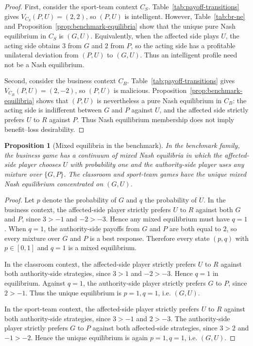 \documentclass[a4paper,fleqn]{cas-dc}
\newtheorem{proposition}[definition]{Proposition}
\theoremstyle{remark}
\begin{document}
\begin{proof}
First, consider the sport-team context $C_S$. Table~\ref{tab:payoff-transitions} gives $V_{C_S}(P,U)=(2,2)$, so $(P,U)$ is intelligent. However, Table~\ref{tab:br-ne} and Proposition~\ref{prop:benchmark-equilibria} show that the unique pure Nash equilibrium in $C_S$ is $(G,U)$. Equivalently, when the affected side plays $U$, the acting side obtains $3$ from $G$ and $2$ from $P$, so the acting side has a profitable unilateral deviation from $(P,U)$ to $(G,U)$. Thus an intelligent profile need not be a Nash equilibrium.

Second, consider the business context $C_B$. Table~\ref{tab:payoff-transitions} gives $V_{C_B}(P,U)=(2,-2)$, so $(P,U)$ is malicious. Proposition~\ref{prop:benchmark-equilibria} shows that $(P,U)$ is nevertheless a pure Nash equilibrium in $C_B$: the acting side is indifferent between $G$ and $P$ against $U$, and the affected side strictly prefers $U$ to $R$ against $P$. Thus Nash equilibrium membership does not imply benefit--loss desirability.
\end{proof}


\begin{proposition}[Mixed equilibria in the benchmark]
\label{prop:mixed-equilibria}
In the benchmark family, the business game has a continuum of mixed Nash equilibria in which the affected-side player chooses $U$ with probability one and the authority-side player uses any mixture over $\{G,P\}$. The classroom and sport-team games have the unique mixed Nash equilibrium concentrated on $(G,U)$.
\end{proposition}

\begin{proof}
Let $p$ denote the probability of $G$ and $q$ the probability of $U$. In the business context, the affected-side player strictly prefers $U$ to $R$ against both $G$ and $P$, since $3>-1$ and $-2>-3$. Hence any mixed equilibrium must have $q=1$. When $q=1$, the authority-side payoffs from $G$ and $P$ are both equal to $2$, so every mixture over $G$ and $P$ is a best response. Therefore every state $(p,q)$ with $p\in[0,1]$ and $q=1$ is a mixed equilibrium.

In the classroom context, the affected-side player strictly prefers $U$ to $R$ against both authority-side strategies, since $3>1$ and $-2>-3$. Hence $q=1$ in equilibrium. Against $q=1$, the authority-side player strictly prefers $G$ to $P$, since $2>-1$. Thus the unique equilibrium is $p=1,q=1$, i.e. $(G,U)$.

In the sport-team context, the affected-side player strictly prefers $U$ to $R$ against both authority-side strategies, since $3>-1$ and $2>-3$. The authority-side player strictly prefers $G$ to $P$ against both affected-side strategies, since $3>2$ and $-1>-2$. Hence the unique equilibrium is again $p=1,q=1$, i.e. $(G,U)$.
\end{proof}
\end{document}
